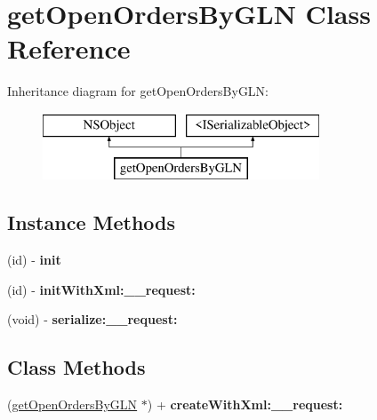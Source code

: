 \hypertarget{interfaceget_open_orders_by_g_l_n}{}\section{get\+Open\+Orders\+By\+G\+L\+N Class Reference}
\label{interfaceget_open_orders_by_g_l_n}
Inheritance diagram for get\+Open\+Orders\+By\+G\+L\+N\+:\begin{figure}[H]
\begin{center}
\leavevmode
\includegraphics[height=2.000000cm]{interfaceget_open_orders_by_g_l_n}
\end{center}
\end{figure}
\subsection*{Instance Methods}
\begin{DoxyCompactItemize}
\item 
\hypertarget{interfaceget_open_orders_by_g_l_n_af5ccca495aa89530db44cd7f383dbd7b}{}(id) -\/ {\bfseries init}\label{interfaceget_open_orders_by_g_l_n_af5ccca495aa89530db44cd7f383dbd7b}

\item 
\hypertarget{interfaceget_open_orders_by_g_l_n_ac30298574aed2c70bf27b7a1d500e55d}{}(id) -\/ {\bfseries init\+With\+Xml\+:\+\_\+\+\_\+request\+:}\label{interfaceget_open_orders_by_g_l_n_ac30298574aed2c70bf27b7a1d500e55d}

\item 
\hypertarget{interfaceget_open_orders_by_g_l_n_a7d2f340ae99bde330d9cc185fc11fb0a}{}(void) -\/ {\bfseries serialize\+:\+\_\+\+\_\+request\+:}\label{interfaceget_open_orders_by_g_l_n_a7d2f340ae99bde330d9cc185fc11fb0a}

\end{DoxyCompactItemize}
\subsection*{Class Methods}
\begin{DoxyCompactItemize}
\item 
\hypertarget{interfaceget_open_orders_by_g_l_n_a3f1008e60d66b3d93d4b9841a4c5c683}{}(\hyperlink{interfaceget_open_orders_by_g_l_n}{get\+Open\+Orders\+By\+G\+L\+N} $\ast$) + {\bfseries create\+With\+Xml\+:\+\_\+\+\_\+request\+:}\label{interfaceget_open_orders_by_g_l_n_a3f1008e60d66b3d93d4b9841a4c5c683}

\end{DoxyCompactItemize}
